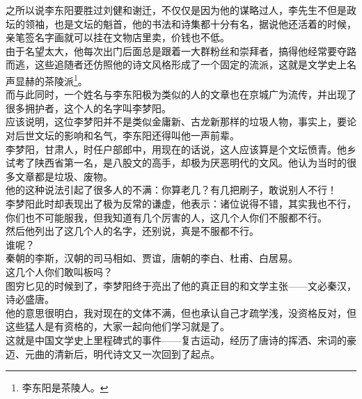 \begin{multicols}{\theparacolNo}
之所以说李东阳要胜过刘健和谢迁，不仅仅是因为他的谋略过人，李先生不但是政坛的领袖，也是文坛的魁首，他的书法和诗集都十分有名，据说他还活着的时候，亲笔签名字画就可以挂在文物店里卖，价钱也不低。\\

由于名望太大，他每次出门后面总是跟着一大群粉丝和崇拜者，搞得他经常要夺路而逃，这些追随者还仿照他的诗文风格形成了一个固定的流派，这就是文学史上名声显赫的茶陵派\footnote{李东阳是茶陵人。}。\\

而与此同时，一个姓名与李东阳极为类似的人的文章也在京城广为流传，并出现了很多拥护者，这个人的名字叫李梦阳。\\

应该说明，这位李梦阳并不是类似金庸新、古龙新那样的垃圾人物，事实上，要论对后世文坛的影响和名气，李东阳还得叫他一声前辈。\\

李梦阳，甘肃人，时任户部郎中，用现在的话说，这人应该算是个文坛愤青。他乡试考了陕西省第一名，是八股文的高手，却极为厌恶明代的文风。他认为当时的很多文章都是垃圾、废物。\\

他的这种说法引起了很多人的不满：你算老几？有几把刷子，敢说别人不行！\\

李梦阳此时却表现出了极为反常的谦虚，他表示：诸位说得不错，其实我也不行，你们也不可能服我，但我知道有几个厉害的人，这几个人你们不服都不行。\\

然后他列出了这几个人的名字，还别说，真是不服都不行。\\

谁呢？\\

秦朝的李斯，汉朝的司马相如、贾谊，唐朝的李白、杜甫、白居易。\\

这几个人你们敢叫板吗？\\

图穷匕见的时候到了，李梦阳终于亮出了他的真正目的和文学主张——文必秦汉，诗必盛唐。\\

他的意思很明白，我对现在的文体不满，但也承认自己才疏学浅，没资格反对，但这些猛人是有资格的，大家一起向他们学习就是了。\\

这就是中国文学史上里程碑式的事件——复古运动，经历了唐诗的挥洒、宋词的豪迈、元曲的清新后，明代诗文又一次回到了起点。\\


\end{multicols}
